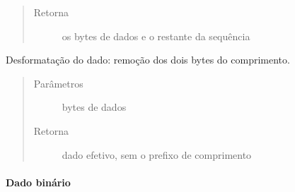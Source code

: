 \documentclass[letterpaper,10pt,brazil]{sphinxmanual}
\begin{document}
\begin{fulllineitems}
\begin{fulllineitems}
\begin{quote}
\begin{description}
\item[{Retorna}] \leavevmode
\sphinxAtStartPar
os bytes de dados e o restante da sequência

\end{description}\end{quote}

\end{fulllineitems}


\begin{fulllineitems}
\label{\detokenize{estrutarq.dado:estrutarq.dado.DadoPrefixado.remova_formatacao}}
\pysigstartsignatures
{}
\pysigstopsignatures
\sphinxAtStartPar
Desformatação do dado: remoção dos dois bytes do comprimento.
\begin{quote}\begin{description}
\item[{Parâmetros}] \leavevmode
\sphinxAtStartPar
{} \textendash{} bytes de dados

\item[{Retorna}] \leavevmode
\sphinxAtStartPar
dado efetivo, sem o prefixo de comprimento

\end{description}\end{quote}

\end{fulllineitems}


\end{fulllineitems}



\paragraph{Dado binário}
\label{\detokenize{estrutarq.dado:dado-binario}}
\end{document}
